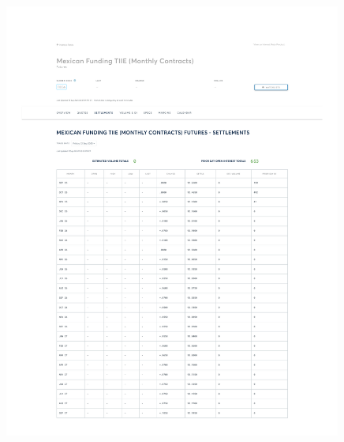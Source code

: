 \documentclass[11pt,a4paper]{article} %
\begin{document}
\begin{figure}[h]
  \centering
  \includegraphics[width=0.99\textwidth]{appendix/TIIE12SEP.pdf}
  \label{fig:tiie_settlements}
\end{figure}
\end{document}

